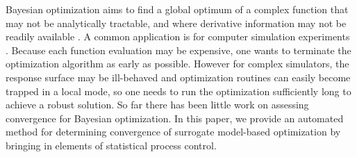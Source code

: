 \documentclass[AMA,Times1COL]{WileyNJDv5} %
\begin{document}
%
Bayesian optimization aims to find a global optimum of a complex function that 
may not be analytically tractable, and where derivative information may not be 
readily available \citep{mockus:1989,brochu:2010}. A common application is for 
computer simulation experiments \cite{gramacy:2020}. Because each function 
evaluation may be expensive, one wants to terminate the optimization algorithm 
as early as possible. However for complex simulators, the response surface may 
be ill-behaved and optimization routines can easily become trapped in a local 
mode, so one needs to run the optimization sufficiently long to achieve a 
robust solution. So far there has been little work on assessing convergence for 
Bayesian optimization. In this paper, we provide an automated method for 
determining convergence of surrogate model-based optimization by bringing in
elements of statistical process control.



%
%
%
%
%
%
\end{document}
